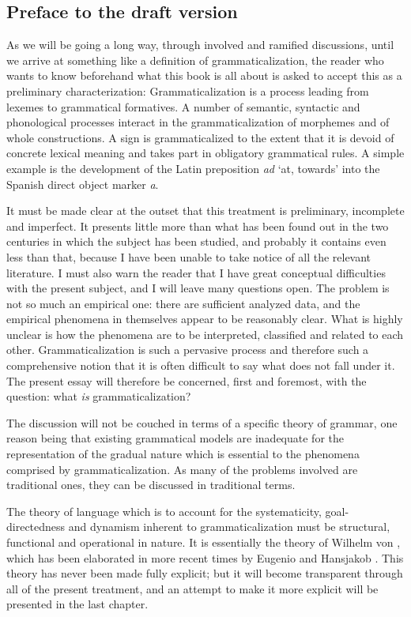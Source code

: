 \begin{refsection}

\section{Preface to the draft version}

As we will be going a long way, through involved and ramified discussions, until we arrive at something like a definition of grammaticalization, the reader who wants to know beforehand what this book is all about is asked to accept this as a preliminary characterization: Grammaticalization is a process leading from lexemes to grammatical formatives. A number of semantic, syntactic and phonological processes interact in the grammaticalization of morphemes and of whole constructions. A sign is grammaticalized to the extent that it is devoid of concrete lexical meaning and takes part in obligatory grammatical rules. A simple example is the development of the Latin preposition \textit{ad} ‘at, towards’ into the Spanish direct object marker \textit{a}.

It must be made clear at the outset that this treatment is preliminary, incomplete and imperfect. It presents little more than what has been found out in the two centuries in which the subject has been studied, and probably it contains even less than that, because I have been unable to take notice of all the relevant literature. I must also warn the reader that I have great conceptual difficulties with the present subject, and I will leave many questions open. The problem is not so much an empirical one: there are sufficient analyzed data, and the empirical phenomena in themselves appear to be reasonably clear. What is highly unclear is how the phenomena are to be interpreted, classified and related to each other. Grammaticalization is such a pervasive process and therefore such a comprehensive notion that it is often difficult to say what does not fall under it. The present essay will therefore be concerned, first and foremost, with the question: what \textit{is} grammaticalization?

The discussion will not be couched in terms of a specific theory of grammar, one reason being that existing grammatical models are inadequate for the representation of the gradual nature which is essential to the phenomena comprised by grammaticalization. As many of the problems involved are traditional ones, they can be discussed in traditional terms.

The theory of language which is to account for the systematicity, goal-directedness and dynamism inherent to grammaticalization must be structural, functional and operational in nature. It is essentially the theory of Wilhelm von \citet{Humboldt1836}, which has been elaborated in more recent times by Eugenio \citet{Coseriu1974} and Hansjakob \citet{Seiler1978}. This theory has never been made fully explicit; but it will become transparent through all of the present treatment, and an attempt to make it more explicit will be presented in the last chapter.


\end{refsection}
